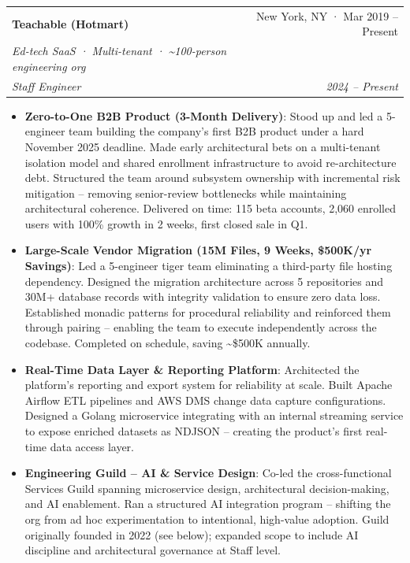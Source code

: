 \documentclass[letterpaper,11pt]{article}
\makeatletter
\newcommand{\resumeItem}[2]{
  \item\small{
    \textbf{#1}{: #2 \vspace{-2pt}}
  }
}
\newcommand{\resumeSubheadingWithDesc}[5]{
  \vspace{-1pt}\item
    \begin{tabular*}{0.97\textwidth}[t]{l@{\extracolsep{\fill}}r}
      \textbf{#1} & #2 \\
      \small\textit{#3} & \\
      \textit{\small#4} & \textit{\small #5} \\
    \end{tabular*}\vspace{-5pt}
}
\newcommand{\resumeItemListStart}{\begin{itemize}}
\newcommand{\resumeItemListEnd}{\end{itemize}\vspace{-5pt}}
\makeatother
\begin{document}
    \resumeSubheadingWithDesc
      {Teachable (Hotmart)}{New York, NY · Mar 2019 -- Present}
      {Ed-tech SaaS · Multi-tenant · \textasciitilde100-person engineering org}
      {Staff Engineer}{2024 -- Present}
      \resumeItemListStart
        \resumeItem{Zero-to-One B2B Product (3-Month Delivery)}
          {Stood up and led a 5-engineer team building the company's first B2B product under a hard November 2025 deadline. Made early architectural bets on a multi-tenant isolation model and shared enrollment infrastructure to avoid re-architecture debt. Structured the team around subsystem ownership with incremental risk mitigation -- removing senior-review bottlenecks while maintaining architectural coherence. Delivered on time: 115 beta accounts, 2,060 enrolled users with 100\% growth in 2 weeks, first closed sale in Q1.}
        \resumeItem{Large-Scale Vendor Migration (15M Files, 9 Weeks, \$500K/yr Savings)}
          {Led a 5-engineer tiger team eliminating a third-party file hosting dependency. Designed the migration architecture across 5 repositories and 30M+ database records with integrity validation to ensure zero data loss. Established monadic patterns for procedural reliability and reinforced them through pairing -- enabling the team to execute independently across the codebase. Completed on schedule, saving \textasciitilde\$500K annually.}
        \resumeItem{Real-Time Data Layer \& Reporting Platform}
          {Architected the platform's reporting and export system for reliability at scale. Built Apache Airflow ETL pipelines and AWS DMS change data capture configurations. Designed a Golang microservice integrating with an internal streaming service to expose enriched datasets as NDJSON -- creating the product's first real-time data access layer.}
        \resumeItem{Engineering Guild -- AI \& Service Design}
          {Co-led the cross-functional Services Guild spanning microservice design, architectural decision-making, and AI enablement. Ran a structured AI integration program -- shifting the org from ad hoc experimentation to intentional, high-value adoption. Guild originally founded in 2022 (see below); expanded scope to include AI discipline and architectural governance at Staff level.}
      \resumeItemListEnd
\end{document}
